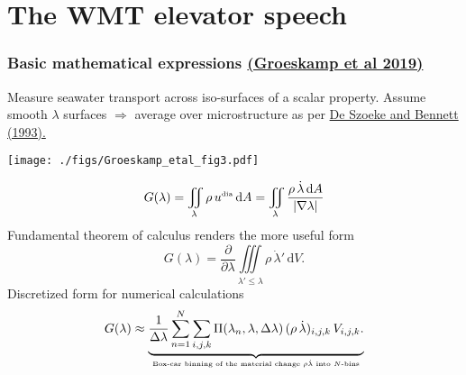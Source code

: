 \documentclass[10pt]{beamer}
\begin{document}
\section{The WMT elevator speech}


\begin{frame}
  \frametitle{Basic mathematical expressions
\small \href{https://www.annualreviews.org/doi/abs/10.1146/annurev-marine-010318-095421}{(Groeskamp et al 2019)}
}

{\sc Measure seawater transport across iso-surfaces of a scalar
  property.}  \scriptsize Assume smooth $\lambda$ surfaces
$\Longrightarrow$ average over microstructure as per
\href{https://doi.org/10.1175/1520-0485(1993)023<2254:MFADS>2.0.CO;2}{De
  Szoeke and Bennett (1993).}  \footnotesize


\begin{center}
\vspace{-.1cm}
{\texttt{[image: ./figs/Groeskamp\_etal\_fig3.pdf]}}
\end{center}
\vspace{-.5cm}


\begin{equation}
G(\lambda) = \iint\limits_{\lambda} \rho \, u^{\mbox{\tiny dia}} \, \mathrm{d}A = 
\iint\limits_{\lambda} \frac{\rho \, \dot{\lambda} \, \mathrm{d}A}{|\nabla \lambda|}
\label{eq:wmt-defined-math}
\end{equation}
 Fundamental theorem of calculus renders the more useful form 
\begin{equation}
G(\lambda) = 
\frac{\partial}{\partial \lambda}
\iiint\limits_{\lambda' \le \lambda}
\rho \, \dot{\lambda}' \, \mathrm{d}V.
\label{eq:wmt-identity-math}
\end{equation}
Discretized form for numerical calculations 
\begin{equation}
G(\lambda) 
\approx 
\underbrace{
  \frac{1}{\Delta \lambda} \sum_{n=1}^{N} \sum_{i,j,k}
  \Pi(\lambda_{n},\lambda,\Delta \lambda)
  \, (\rho \, \dot{\lambda})_{i,j,k} \, V_{i,j,k}.
}_{\mbox{\tiny Box-car binning of the material change $\rho \dot{\lambda}$  into $N$-bins}}
\label{eq:wmt-discrete-math}
\end{equation}


\end{frame}
\end{document}

